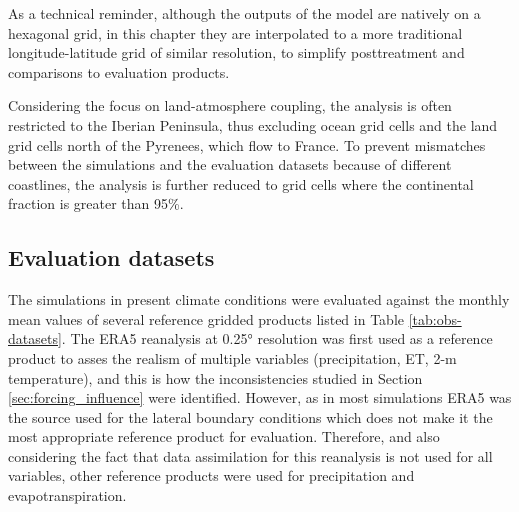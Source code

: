 As a technical reminder, although the outputs of the model are natively on a hexagonal grid, in this chapter they are interpolated to a more traditional longitude-latitude grid of similar resolution, to simplify posttreatment and comparisons to evaluation products.

Considering the focus on land-atmosphere coupling, the analysis is often restricted to the Iberian Peninsula, thus excluding ocean grid cells and the land grid cells north of the Pyrenees, which flow to France. To prevent mismatches between the simulations and the evaluation datasets because of different coastlines, the analysis is further reduced to grid cells where the continental fraction is greater than 95\%. 

\subsection{Evaluation datasets}
\begin{table}[hbtp]
    \caption{Gridded datasets used for evaluation.}
    \label{tab:obs-datasets}
\end{table}

The simulations in present climate conditions were evaluated against the monthly mean values of several reference gridded products listed in Table \ref{tab:obs-datasets}.
The ERA5 reanalysis \citep{hersbach_era5_2020} at 0.25° resolution was first used as a reference product to asses the realism of multiple variables (precipitation, ET, 2-m temperature), and this is how the inconsistencies studied in Section \ref{sec:forcing_influence} were identified. However, as in most simulations ERA5 was the source used for the lateral boundary conditions which does not make it the most appropriate reference product for evaluation. Therefore, and also considering the fact that data assimilation for this reanalysis is not used for all variables, other reference products were used for precipitation and evapotranspiration.

